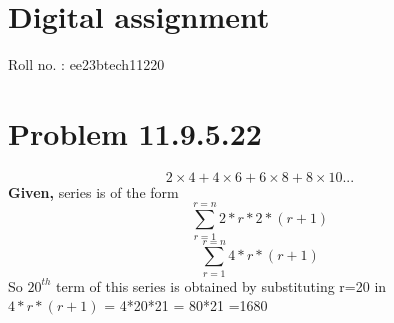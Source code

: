 \documentclass[12pt]{article}
\begin{document}
\section*{Digital assignment}
Roll no. : ee23btech11220


\section{\textbf{Problem 11.9.5.22}}
$$2\times4+4\times6+6\times8+8\times10...$$
\textbf{Given,}
series is of the form
\begin{equation}
\sum_{r=1}^{r=n} 2*r*2*(r+1)
\end{equation}
\begin{equation}
\sum_{r=1}^{r=n} 4*r*(r+1)
\end{equation}
So $20^{th}$ term of this series is obtained by substituting r=20 in\\ $4*r*(r+1)$
= 4*20*21
= 80*21
=1680
\end{document}
